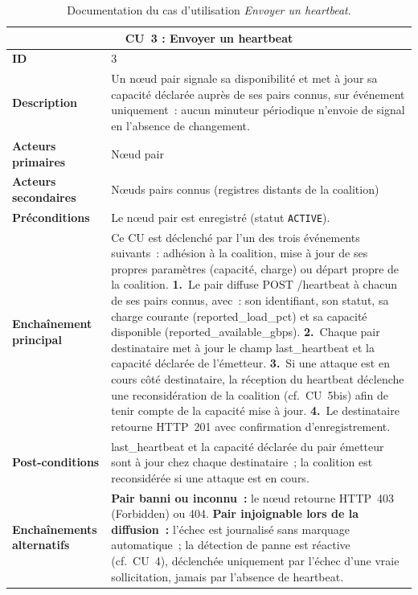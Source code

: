 \begin{table}[H]
\centering
\renewcommand{\arraystretch}{1.5}
\begin{tabular}{|p{3.5cm}|p{10.5cm}|}
\hline
\multicolumn{2}{|c|}{\textbf{CU~3 : Envoyer un heartbeat}} \\
\hline
\textbf{ID} & 3 \\
\hline
\textbf{Description} & Un nœud pair signale sa disponibilité et met à jour sa capacité déclarée auprès de ses pairs connus, sur événement uniquement~: aucun minuteur périodique n'envoie de signal en l'absence de changement. \\
\hline
\textbf{Acteurs primaires} & Nœud pair \\
\hline
\textbf{Acteurs secondaires} & Nœuds pairs connus (registres distants de la coalition) \\
\hline
\textbf{Préconditions} & Le nœud pair est enregistré (statut \texttt{ACTIVE}). \\
\hline
\textbf{Enchaînement principal} &
Ce CU est déclenché par l'un des trois événements suivants~: adhésion à la coalition, mise à jour de ses propres paramètres (capacité, charge) ou départ propre de la coalition.\newline
\textbf{1.}\ Le pair diffuse {POST /heartbeat} à chacun de ses pairs connus, avec~: son identifiant, son statut, sa charge courante ({reported\_load\_pct}) et sa capacité disponible ({reported\_available\_gbps}).\newline
\textbf{2.}\ Chaque pair destinataire met à jour le champ {last\_heartbeat} et la capacité déclarée de l'émetteur.\newline
\textbf{3.}\ Si une attaque est en cours côté destinataire, la réception du heartbeat déclenche une reconsidération de la coalition (cf.\ CU~5bis) afin de tenir compte de la capacité mise à jour.\newline
\textbf{4.}\ Le destinataire retourne HTTP~201 avec confirmation d'enregistrement. \\
\hline
\textbf{Post-conditions} & {last\_heartbeat} et la capacité déclarée du pair émetteur sont à jour chez chaque destinataire~; la coalition est reconsidérée si une attaque est en cours. \\
\hline
\textbf{Enchaînements alternatifs} &
\textbf{Pair banni ou inconnu~:} le nœud retourne HTTP~403 (Forbidden) ou 404.\newline
\textbf{Pair injoignable lors de la diffusion~:} l'échec est journalisé sans marquage automatique~; la détection de panne est réactive (cf.\ CU~4), déclenchée uniquement par l'échec d'une vraie sollicitation, jamais par l'absence de heartbeat. \\

\hline
\end{tabular}
\caption{Documentation du cas d'utilisation \textit{Envoyer un heartbeat}.}
\label{tab:cu3}
\end{table}

